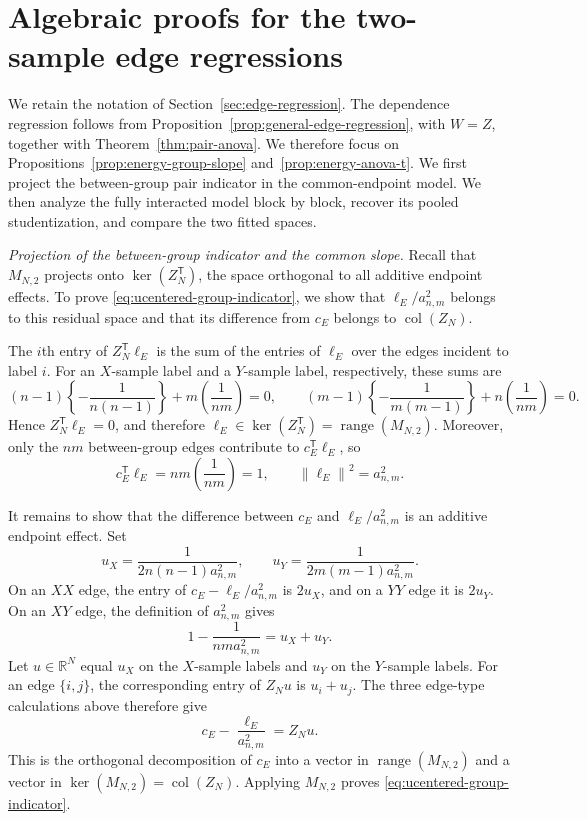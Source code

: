 \documentclass[11pt]{article}
\theoremstyle{plain}
\theoremstyle{definition}
\theoremstyle{remark}
\newcommand{\R}{\mathbb R}
\newcommand{\range}{\operatorname{range}}
\newcommand{\norm}[1]{\left\lVert #1\right\rVert}
\begin{document}
\section{Algebraic proofs for the two-sample edge regressions}
\label{app:two-sample-nesting}

We retain the notation of Section~\ref{sec:edge-regression}.
The dependence regression follows from
Proposition~\ref{prop:general-edge-regression}, with $W=Z$, together with
Theorem~\ref{thm:pair-anova}.  We therefore focus on
Propositions~\ref{prop:energy-group-slope} and~\ref{prop:energy-anova-t}.
We first project the between-group pair indicator in the common-endpoint
model.  We then analyze the fully interacted model block by block, recover
its pooled studentization, and compare the two fitted spaces.

\noindent\emph{Projection of the between-group indicator and the common
slope.}
Recall that $M_{N,2}$ projects onto $\ker(Z_N^\mathsf T)$, the space
orthogonal to all additive endpoint effects.  To prove
\eqref{eq:ucentered-group-indicator}, we show that
$\ell_E/a_{n,m}^2$ belongs to this residual space and that its difference
from $c_E$ belongs to $\operatorname{col}(Z_N)$.

The $i$th entry of $Z_N^\mathsf T\ell_E$ is the sum of the entries of
$\ell_E$ over the edges incident to label $i$.  For an $X$-sample label and
a $Y$-sample label, respectively, these sums are
\[
 (n-1)\left\{-\frac1{n(n-1)}\right\}
 +m\left(\frac1{nm}\right)=0,
 \qquad
 (m-1)\left\{-\frac1{m(m-1)}\right\}
 +n\left(\frac1{nm}\right)=0.
\]
Hence $Z_N^\mathsf T\ell_E=0$, and therefore
$\ell_E\in\ker(Z_N^\mathsf T)=\range(M_{N,2})$.  Moreover, only the $nm$
between-group edges contribute to $c_E^\mathsf T\ell_E$, so
\[
 c_E^\mathsf T\ell_E=nm\left(\frac1{nm}\right)=1,
 \qquad
 \norm{\ell_E}^2=a_{n,m}^2.
\]

It remains to show that the difference between $c_E$ and
$\ell_E/a_{n,m}^2$ is an additive endpoint effect.  Set
\[
 u_X=\frac{1}{2n(n-1)a_{n,m}^2},
 \qquad
 u_Y=\frac{1}{2m(m-1)a_{n,m}^2}.
\]
On an $XX$ edge, the entry of $c_E-\ell_E/a_{n,m}^2$ is $2u_X$, and on a
$YY$ edge it is $2u_Y$.  On an $XY$ edge, the definition of $a_{n,m}^2$
gives
\[
 1-\frac{1}{nm a_{n,m}^2}=u_X+u_Y.
\]
Let $u\in\R^N$ equal $u_X$ on the $X$-sample labels and $u_Y$ on the
$Y$-sample labels.  For an edge $\{i,j\}$, the corresponding entry of
$Z_Nu$ is $u_i+u_j$.  The three edge-type calculations above therefore give
\[
 c_E-\frac{\ell_E}{a_{n,m}^2}=Z_Nu.
\]
This is the orthogonal decomposition of $c_E$ into a vector in
$\range(M_{N,2})$ and a vector in
$\ker(M_{N,2})=\operatorname{col}(Z_N)$.  Applying $M_{N,2}$ proves
\eqref{eq:ucentered-group-indicator}.
\end{document}
